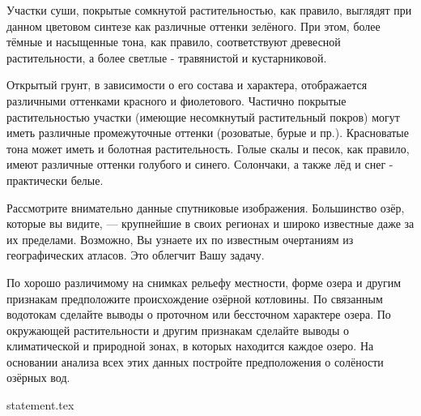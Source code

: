 Участки суши, покрытые сомкнутой растительностью, как правило, выглядят при данном цветовом синтезе как различные оттенки зелёного. При этом, более тёмные и насыщенные тона, как правило, соответствуют древесной растительности, а более светлые - травянистой и кустарниковой.

Открытый грунт, в зависимости о его состава и характера, отображается различными оттенками красного и фиолетового. Частично покрытые растительностью участки (имеющие несомкнутый растительный покров) могут иметь различные промежуточные оттенки (розоватые, бурые и пр.). Красноватые тона может иметь и болотная растительность. Голые скалы и песок, как правило, имеют различные оттенки голубого и синего. Солончаки, а также лёд и снег - практически белые.

Рассмотрите внимательно данные спутниковые изображения. Большинство озёр, которые вы видите, — крупнейшие в своих регионах и широко известные даже за их пределами. Возможно, Вы узнаете их по известным очертаниям из географических атласов. Это облегчит Вашу задачу.

По хорошо различимому на снимках рельефу местности, форме озера и другим признакам предположите происхождение озёрной котловины. По связанным водотокам сделайте выводы о проточном или бессточном характере озера. По окружающей растительности и другим признакам сделайте выводы о климатической и природной зонах, в которых находится каждое озеро. На основании анализа всех этих данных постройте предположения о солёности озёрных вод.

{statement.tex}